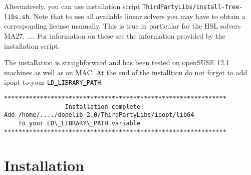 Alternatively, you can use installation script
\texttt{ThirdPartyLibs/install-free-libs.sh}. Note that to use all 
available linear solvers you may have to obtain a corresponding license 
manually. This is true in particular for the HSL solvers MA27, $\ldots$.
For information on these see the information provided by the installation
script.

The installation is straighforward and has been tested on openSUSE 12.1
machines as well as on MAC. At the end of the installtion do not forget to
add ipopt to your \texttt{LD\underline{ }LIBRARY\underline{ }PATH}:
\begin{lstlisting}
**************************************************************
                 Installation complete!
Add /home/..../dopelib-2.0/ThirdPartyLibs/ipopt/lib64
    to your LD\_LIBRARY\_PATH variable
**************************************************************
\end{lstlisting}



\section{Installation}\label{sec_installation}
